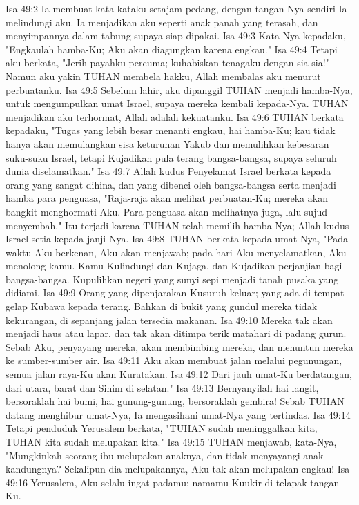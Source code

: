Isa 49:2  Ia membuat kata-kataku setajam pedang, dengan tangan-Nya sendiri Ia melindungi aku. Ia menjadikan aku seperti anak panah yang terasah, dan menyimpannya dalam tabung supaya siap dipakai.
Isa 49:3  Kata-Nya kepadaku, "Engkaulah hamba-Ku; Aku akan diagungkan karena engkau."
Isa 49:4  Tetapi aku berkata, "Jerih payahku percuma; kuhabiskan tenagaku dengan sia-sia!" Namun aku yakin TUHAN membela hakku, Allah membalas aku menurut perbuatanku.
Isa 49:5  Sebelum lahir, aku dipanggil TUHAN menjadi hamba-Nya, untuk mengumpulkan umat Israel, supaya mereka kembali kepada-Nya. TUHAN menjadikan aku terhormat, Allah adalah kekuatanku.
Isa 49:6  TUHAN berkata kepadaku, "Tugas yang lebih besar menanti engkau, hai hamba-Ku; kau tidak hanya akan memulangkan sisa keturunan Yakub dan memulihkan kebesaran suku-suku Israel, tetapi Kujadikan pula terang bangsa-bangsa, supaya seluruh dunia diselamatkan."
Isa 49:7  Allah kudus Penyelamat Israel berkata kepada orang yang sangat dihina, dan yang dibenci oleh bangsa-bangsa serta menjadi hamba para penguasa, "Raja-raja akan melihat perbuatan-Ku; mereka akan bangkit menghormati Aku. Para penguasa akan melihatnya juga, lalu sujud menyembah." Itu terjadi karena TUHAN telah memilih hamba-Nya; Allah kudus Israel setia kepada janji-Nya.
Isa 49:8  TUHAN berkata kepada umat-Nya, "Pada waktu Aku berkenan, Aku akan menjawab; pada hari Aku menyelamatkan, Aku menolong kamu. Kamu Kulindungi dan Kujaga, dan Kujadikan perjanjian bagi bangsa-bangsa. Kupulihkan negeri yang sunyi sepi menjadi tanah pusaka yang didiami.
Isa 49:9  Orang yang dipenjarakan Kusuruh keluar; yang ada di tempat gelap Kubawa kepada terang. Bahkan di bukit yang gundul mereka tidak kekurangan, di sepanjang jalan tersedia makanan.
Isa 49:10  Mereka tak akan menjadi haus atau lapar, dan tak akan ditimpa terik matahari di padang gurun. Sebab Aku, penyayang mereka, akan membimbing mereka, dan menuntun mereka ke sumber-sumber air.
Isa 49:11  Aku akan membuat jalan melalui pegunungan, semua jalan raya-Ku akan Kuratakan.
Isa 49:12  Dari jauh umat-Ku berdatangan, dari utara, barat dan Sinim di selatan."
Isa 49:13  Bernyanyilah hai langit, bersoraklah hai bumi, hai gunung-gunung, bersoraklah gembira! Sebab TUHAN datang menghibur umat-Nya, Ia mengasihani umat-Nya yang tertindas.
Isa 49:14  Tetapi penduduk Yerusalem berkata, "TUHAN sudah meninggalkan kita, TUHAN kita sudah melupakan kita."
Isa 49:15  TUHAN menjawab, kata-Nya, "Mungkinkah seorang ibu melupakan anaknya, dan tidak menyayangi anak kandungnya? Sekalipun dia melupakannya, Aku tak akan melupakan engkau!
Isa 49:16  Yerusalem, Aku selalu ingat padamu; namamu Kuukir di telapak tangan-Ku.
